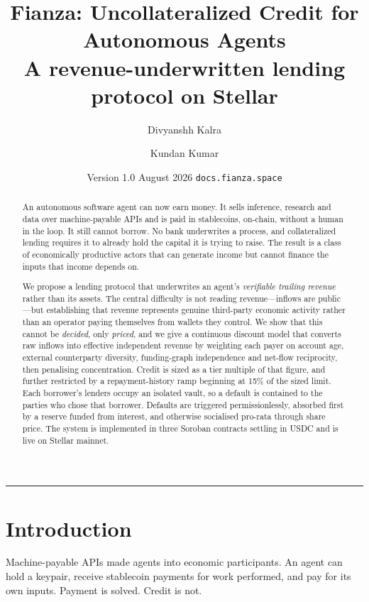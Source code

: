 \documentclass[11pt,a4paper]{article}
\title{\vspace{-1.2cm}\textbf{Fianza: Uncollateralized Credit for Autonomous Agents}\\[0.35em]
\large A revenue-underwritten lending protocol on Stellar}
\author{Divyanshh Kalra \and Kundan Kumar}
\date{Version 1.0 \quad\textbullet\quad August 2026 \quad\textbullet\quad \texttt{docs.fianza.space}}
\begin{document}
\maketitle

\begin{abstract}
\noindent
An autonomous software agent can now earn money. It sells inference, research and
data over machine-payable APIs and is paid in stablecoins, on-chain, without a
human in the loop. It still cannot borrow. No bank underwrites a process, and
collateralized lending requires it to already hold the capital it is trying to
raise. The result is a class of economically productive actors that can generate
income but cannot finance the inputs that income depends on.

We propose a lending protocol that underwrites an agent's \emph{verifiable
trailing revenue} rather than its assets. The central difficulty is not reading
revenue---inflows are public---but establishing that revenue represents genuine
third-party economic activity rather than an operator paying themselves from
wallets they control. We show that this cannot be \emph{decided}, only
\emph{priced}, and we give a continuous discount model that converts raw inflows
into effective independent revenue by weighting each payer on account age,
external counterparty diversity, funding-graph independence and net-flow
reciprocity, then penalising concentration. Credit is sized as a tier multiple of
that figure, and further restricted by a repayment-history ramp beginning at
15\% of the sized limit. Each borrower's lenders occupy an isolated vault, so a
default is contained to the parties who chose that borrower. Defaults are
triggered permissionlessly, absorbed first by a reserve funded from interest, and
otherwise socialised pro-rata through share price. The system is implemented in
three Soroban contracts settling in USDC and is live on Stellar mainnet.
\end{abstract}

\vspace{0.6em}
\hrule
\vspace{0.4em}

\section{Introduction}

Machine-payable APIs made agents into economic participants. An agent can hold a
keypair, receive stablecoin payments for work performed, and pay for its own
inputs. Payment is solved. Credit is not.
\end{document}
